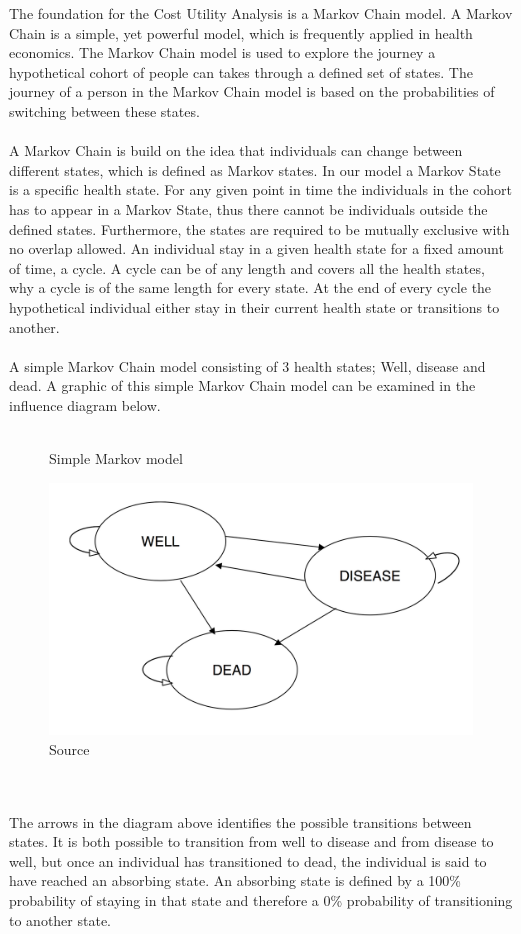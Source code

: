 \documentclass[a4paper,12pt]{article}
\begin{document}
The foundation for the Cost Utility Analysis is a Markov Chain model. A Markov Chain is a simple, yet powerful model, which is frequently applied in health economics. The Markov Chain model is used to explore the journey a hypothetical cohort of people can takes through a defined set of states. The journey of a person in the Markov Chain model is based on the probabilities of switching between these states.
\\\\
A Markov Chain is build on the idea that individuals can change between different states, which is defined as Markov states. In our model a Markov State is a specific health state. For any given point in time the individuals in the cohort has to appear in a Markov State, thus there cannot be individuals outside the defined states. Furthermore, the states are required to be mutually exclusive with no overlap allowed. An individual stay in a given health state for a fixed amount of time, a cycle. A cycle can be of any length and covers all the health states, why a cycle is of the same length for every state. At the end of every cycle the hypothetical individual either stay in their current health state or transitions to another.
\\\\
A simple Markov Chain model consisting of 3 health states; Well, disease and dead. A graphic of this simple Markov Chain model can be examined in the influence diagram below.
\\\\
\begin{figure}[h]
	\centering
	\caption[]{Simple Markov model}
	\label{fig:markov-simple}
	\includegraphics[width=0.7\linewidth]{"Pictures/Markov simple"}
	\caption*{Source}
\end{figure}
\\\\
The arrows in the diagram above identifies the possible transitions between states. It is both possible to transition from well to disease and from disease to well, but once an individual has transitioned to dead, the individual is said to have reached an absorbing state. An absorbing state is defined by a 100\% probability of staying in that state and therefore a 0\% probability of transitioning to another state. 
\end{document}
